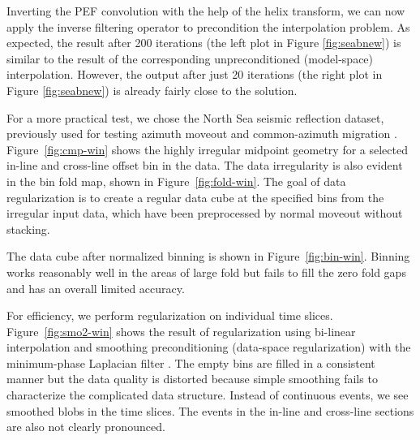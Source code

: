 \par
Inverting the PEF convolution with the help of the helix transform, we
can now apply the inverse filtering operator to precondition the
interpolation problem. As expected, the result after 200 iterations
(the left plot in Figure \ref{fig:seabnew}) is similar to the result
of the corresponding unpreconditioned (model-space) interpolation.
However, the output after just 20 iterations (the right plot in Figure
\ref{fig:seabnew}) is already fairly close to the solution.



For a more practical test, we chose the North Sea seismic reflection
dataset, previously used for testing azimuth moveout and
common-azimuth migration \cite[]{GEO63-02-05740588,SEG-1997-1375}.
Figure~\ref{fig:cmp-win} shows the highly irregular midpoint geometry
for a selected in-line and cross-line offset bin in the data. The data
irregularity is also evident in the bin fold map, shown in
Figure~\ref{fig:fold-win}.  The goal of data regularization is to
create a regular data cube at the specified bins from the irregular
input data, which have been preprocessed by normal moveout without
stacking.

 

The data cube after normalized binning is shown in
Figure~\ref{fig:bin-win}.  Binning works reasonably well in the areas of
large fold but fails to fill the zero fold gaps and has an overall
limited accuracy.


For efficiency, we perform regularization on individual time slices.
Figure~\ref{fig:smo2-win} shows the result of regularization using
bi-linear interpolation and smoothing preconditioning (data-space
regularization) with the minimum-phase Laplacian filter \cite[]{wilsonburg}.
The empty bins are filled in a consistent manner but the data quality
is distorted because simple smoothing fails to characterize the
complicated data structure.  Instead of continuous events, we see
smoothed blobs in the time slices. The events in the in-line and
cross-line sections are also not clearly pronounced.


